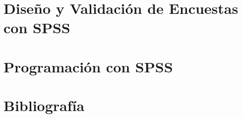 \documentclass[
  letterpaper,
  DIV=11,
  numbers=noendperiod]{scrreprt}
\begin{document}

\chapter{Diseño y Validación de Encuestas con
SPSS}\label{diseuxf1o-y-validaciuxf3n-de-encuestas-con-spss}


\chapter{Programación con SPSS}\label{programaciuxf3n-con-spss}


\chapter{Bibliografía}\label{bibliografuxeda}
\end{document}
